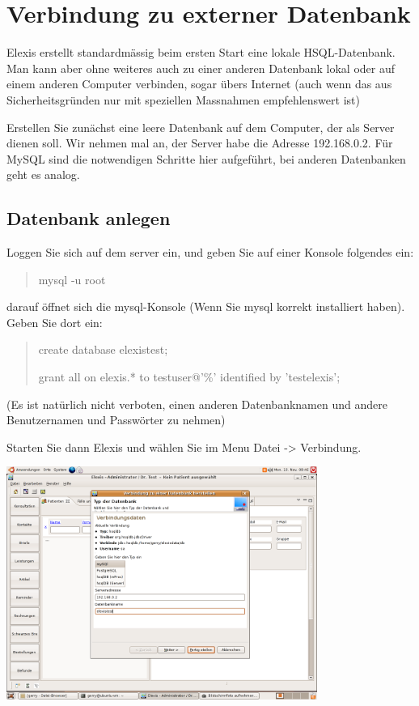 \section{Verbindung zu externer Datenbank}
Elexis erstellt standardmässig beim ersten Start eine lokale HSQL-Datenbank. Man kann aber ohne weiteres auch zu einer anderen Datenbank lokal oder auf einem anderen Computer verbinden, sogar übers Internet (auch wenn das aus Sicherheitsgründen nur mit speziellen Massnahmen empfehlenswert ist)

Erstellen Sie zunächst eine leere Datenbank auf dem Computer, der als Server dienen soll. Wir nehmen mal an, der Server habe die Adresse 192.168.0.2. Für MySQL sind die notwendigen Schritte hier aufgeführt, bei anderen Datenbanken geht es analog.

\subsection{Datenbank anlegen}
Loggen Sie sich auf dem server ein, und geben Sie auf einer Konsole folgendes ein:

\begin{quote}
mysql -u root
\end{quote}

darauf öffnet sich die mysql-Konsole (Wenn Sie mysql korrekt installiert haben).
Geben Sie dort ein:

\begin{quote}
create database elexistest;

grant all on elexis.* to testuser@'\%' identified by 'testelexis';
\end{quote}

(Es ist natürlich nicht verboten, einen anderen Datenbanknamen und andere Benutzernamen und Passwörter zu nehmen)

Starten Sie dann Elexis und wählen Sie im Menu Datei -> Verbindung.

\includegraphics[width=4in]{images/verbindung11.png}



